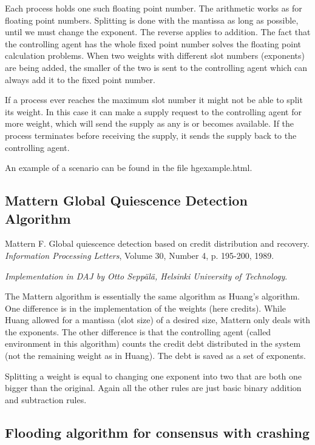 \documentclass[11pt]{article}
\newcommand{\bu}[1]{\textsf{#1}}
\begin{document}
Each process holds one such floating point number. The arithmetic works as
for floating point numbers. Splitting is done with the mantissa as long as possible,
until we must change the exponent. The reverse applies to addition.
The fact that the controlling agent has the whole
fixed point number solves the floating point calculation problems. When two
weights with different slot numbers (exponents) are being added, the smaller
of the two is sent to the controlling agent which can always add it to the
fixed point number.

If a process ever reaches the maximum slot number it might not be able to split
its weight. In this case it can make a supply request to the controlling agent
for more weight, which will send the supply as any is or becomes available.
If the process terminates before receiving the supply, it sends the supply
back to the controlling agent.

An example of a scenario can be found in the file \bu{hgexample.html}.

\subsection{Mattern Global Quiescence Detection Algorithm}

Mattern F.
Global quiescence detection based on credit distribution and recovery.
\emph{Information Processing Letters}, Volume 30, Number 4, p. 195-200, 1989.

\emph{Implementation in DAJ by Otto Sepp\"al\"a, Helsinki University of Technology}.

The Mattern algorithm is essentially the same algorithm as Huang's algorithm.
One difference is in the implementation of the weights (here credits). While
Huang allowed for a mantissa (slot size) of a desired size, Mattern only deals
with the exponents. The other difference is that the controlling agent (called
environment in this algorithm) counts the credit debt distributed in the system
(not the remaining weight as in Huang). The debt is saved as a set of exponents.

Splitting a weight is equal to changing one exponent into two that are both
one bigger than the original. Again all the other rules are just basic binary addition
and subtraction rules.

\subsection{Flooding algorithm for consensus with crashing}
\end{document}
